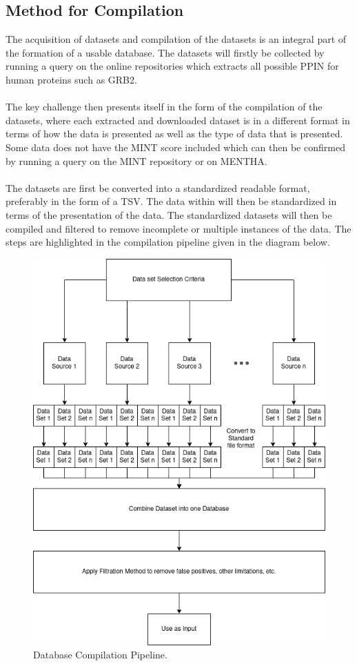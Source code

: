 \subsection{Method for Compilation}
The acquisition of datasets and compilation of the datasets is an integral part of the formation of a usable database. The datasets will firstly be collected by running a query on the online repositories which extracts all possible PPIN for human proteins such as GRB2.\\\\The key challenge then presents itself in the form of the compilation of the datasets, where each extracted and downloaded dataset is in a different format in terms of how the data is presented as well as the type of data that is presented. Some data does not have the MINT score included which can then be confirmed by running a query on the MINT repository or on MENTHA.\\\\
The datasets are first be converted into a standardized readable format, preferably in the form of a TSV. The data within will then be standardized in terms of the presentation of the data. The standardized datasets will then be compiled and filtered to remove incomplete or multiple instances of the data. The steps are highlighted in the compilation pipeline given in the diagram below.
\begin{figure}[h!]
    \centering
\includegraphics[scale=0.7]{Final-Report-Kavish-1/dataset-comp.png}
\caption{Database Compilation Pipeline.}
\label{fig: data_pipelinediag}
\end{figure}


